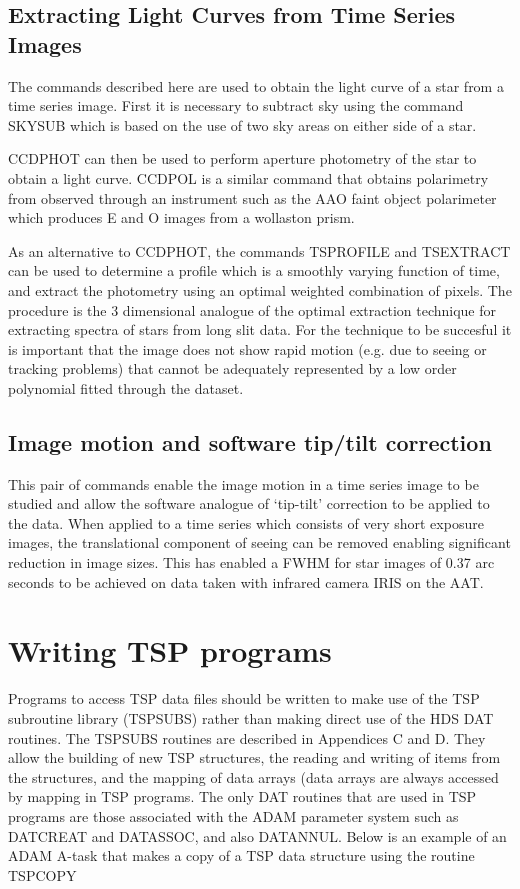 \documentclass[11pt,twoside]{article}
\renewcommand{\_}{\texttt{\symbol{95}}}
\begin{document}
\subsection{Extracting Light Curves from Time Series Images }

The commands described here are used to obtain the light curve of a star from
a time series image. First it is necessary to subtract sky using the command
SKYSUB which is based on the use of two sky areas on either side of a star.

CCDPHOT can then be used to perform aperture photometry of the star to obtain
a light curve. CCDPOL is a similar command that obtains polarimetry from
observed through an instrument such as the AAO faint object polarimeter which
produces E and O images from a wollaston prism.

As an alternative to CCDPHOT, the commands TSPROFILE and TSEXTRACT can be used
to determine a profile which is a smoothly varying function of time, and
extract the photometry using an optimal weighted combination of pixels. The
procedure is the 3 dimensional analogue of the optimal extraction technique
for extracting spectra of stars from long slit data. For the technique to be
succesful it is important that the image does not show rapid motion (e.g. due
to seeing or tracking problems) that cannot be adequately represented by a low
order polynomial fitted through the dataset.

\subsection{Image motion and software tip/tilt correction}

This pair of commands enable the image motion in a time series image to be
studied and allow the software analogue of `tip-tilt' correction to be applied
to the data. When applied to a time series which consists of very short
exposure images, the translational component of seeing can be removed enabling
significant reduction in image sizes. This has enabled
a FWHM for star images of 0.37 arc seconds to be achieved on data taken with
infrared camera IRIS on the AAT.



\section{Writing TSP programs}

Programs to access TSP data files should be written to make use of the
TSP subroutine library (TSPSUBS) rather than making direct use of the HDS
DAT\_ routines. The TSPSUBS routines are described in Appendices C and D.
They allow the building of new TSP structures, the reading and writing of
items from the structures, and the mapping of data arrays (data arrays are
always accessed by mapping in TSP programs. The only DAT\_ routines that
are used in TSP programs are those associated with the ADAM parameter system
such as DAT\_CREAT and DAT\_ASSOC, and also DAT\_ANNUL. Below is an example
of an ADAM A-task that makes a copy of a TSP data structure using the routine
TSP\_COPY
\end{document}
